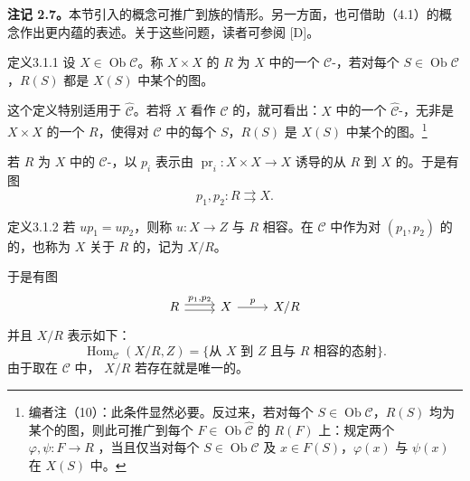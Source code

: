 \textbf{注记 2.7。}本节引入的概念可推广到族的情形。另一方面，也可借助（4.1）的概念作出更内蕴的表述。关于这些问题，读者可参阅 [D]。
\begin{SGAresult}{定义}{3.1.1}
设 $X\in\operatorname{Ob}\mathcal C$。称 $X\times X$ 的 $R$ 为 $X$ 中的一个 $\mathcal C$-，若对每个 $S\in\operatorname{Ob}\mathcal C$，$R(S)$ 都是 $X(S)$ 中某个的图。
\end{SGAresult}
这个定义特别适用于 $\widehat{\mathcal C}$。若将 $X$ 看作 $\widehat{\mathcal C}$ 的，就可看出：$X$ 中的一个 $\widehat{\mathcal C}$-，无非是 $X\times X$ 的一个 $R$，使得对 $\mathcal C$ 中的每个 $S$，$R(S)$ 是 $X(S)$ 中某个的图。\footnote{编者注（10）：此条件显然必要。反过来，若对每个 $S\in\operatorname{Ob}\mathcal C$，$R(S)$ 均为某个的图，则此可推广到每个 $F\in\operatorname{Ob}\widehat{\mathcal C}$ 的 $R(F)$ 上：规定两个 $\varphi,\psi:F\to R$ ，当且仅当对每个 $S\in\operatorname{Ob}\mathcal C$ 及 $x\in F(S)$，$\varphi(x)$ 与 $\psi(x)$ 在 $X(S)$ 中。}

若 $R$ 为 $X$ 中的 $\mathcal C$-，以 $p_i$ 表示由 $\operatorname{pr}_i:X\times X\to X$ 诱导的从 $R$ 到 $X$ 的。于是有图
\[
 p_1,p_2:R\rightrightarrows X.
\]
\begin{SGAresult}{定义}{3.1.2}
若 $up_1=up_2$，则称 $u:X\to Z$ 与 $R$ 相容。在 $\mathcal C$ 中作为对 $(p_1,p_2)$ 的的，也称为 $X$ 关于 $R$ 的，记为 $X/R$。
\end{SGAresult}
于是有图
\[
\begin{tikzcd}R\arrow[r,shift left=.5ex,"{p_1,p_2}"]\arrow[r,shift right=.5ex]&X\arrow[r,"p"]&X/R\end{tikzcd}
\]
并且 $X/R$ 表示如下：
\[
 \operatorname{Hom}_{\mathcal C}(X/R,Z)=\{\text{从 }X\text{ 到 }Z\text{ 且与 }R\text{ 相容的态射}\}.
\]
由于取在 $\mathcal C$ 中， $X/R$ 若存在就是唯一的。

